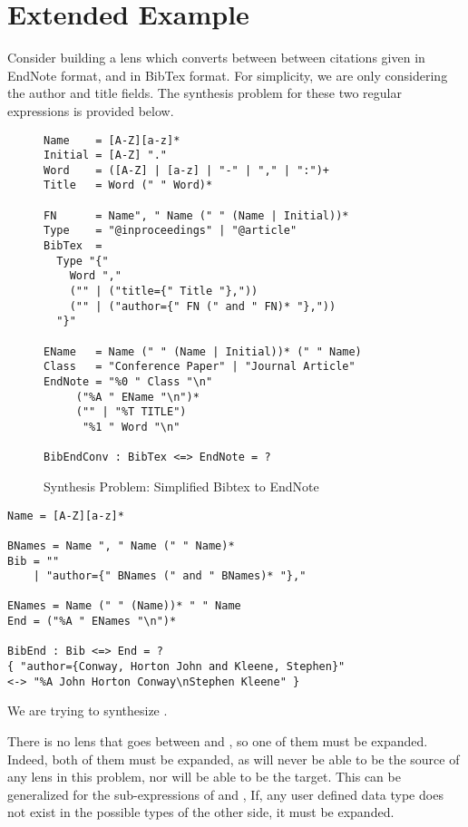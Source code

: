 \section{Extended Example}

Consider building a lens which converts between between citations given
in EndNote format, and in BibTex format.  For simplicity, we are only
considering the author and title fields.  The synthesis problem for these
two regular expressions is provided below.

\begin{figure}
\begin{lstlisting}
Name    = [A-Z][a-z]*
Initial = [A-Z] "."
Word    = ([A-Z] | [a-z] | "-" | "," | ":")+
Title   = Word (" " Word)*

FN      = Name", " Name (" " (Name | Initial))*
Type    = "@inproceedings" | "@article"
BibTex  = 
  Type "{" 
    Word ","
    ("" | ("title={" Title "},"))
    ("" | ("author={" FN (" and " FN)* "},")) 
  "}"

EName   = Name (" " (Name | Initial))* (" " Name)
Class   = "Conference Paper" | "Journal Article"
EndNote = "%0 " Class "\n"
	 ("%A " EName "\n")*
	 ("" | "%T TITLE")
	  "%1 " Word "\n"

BibEndConv : BibTex <=> EndNote = ?
\end{lstlisting}
\caption{Synthesis Problem: Simplified Bibtex to EndNote}
\end{figure}

\begin{lstlisting}
Name = [A-Z][a-z]*

BNames = Name ", " Name (" " Name)*
Bib = ""
    | "author={" BNames (" and " BNames)* "},"

ENames = Name (" " (Name))* " " Name
End = ("%A " ENames "\n")*

BibEnd : Bib <=> End = ?
{ "author={Conway, Horton John and Kleene, Stephen}"
<-> "%A John Horton Conway\nStephen Kleene" }
\end{lstlisting}


We are trying to synthesize \BibEndConv{}.

There is no lens that goes between \BibTex{} and \EndNote{}, so one of them must
be expanded.
Indeed, both of them must be expanded, as \BibTex{} will never be able to be
the source of any lens in this problem, nor will \EndNote{} be able to be the
target.
This can be generalized for the sub-expressions of \BibTex{} and \EndNote{},  
If, any user defined data type does not exist in the possible types of the
other side, it must be expanded.

